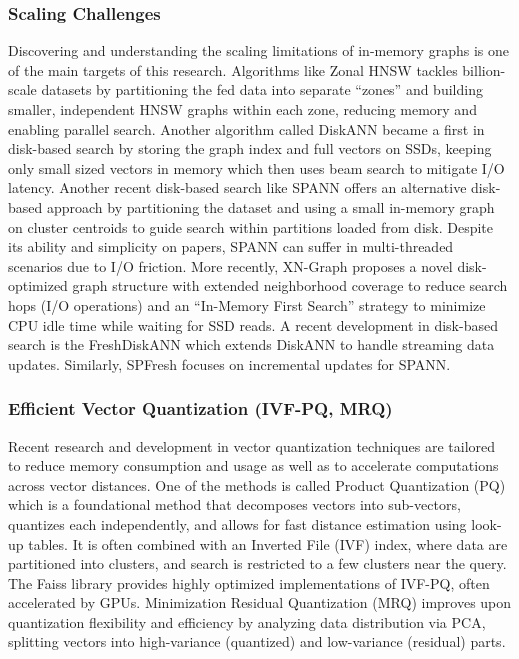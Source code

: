 \documentclass[conference]{IEEEtran}
\begin{document}
\subsubsection{Scaling Challenges}
Discovering and understanding the scaling limitations of in-memory graphs is one of the main targets of this research. Algorithms like Zonal HNSW tackles billion-scale datasets by partitioning the fed data into separate ``zones'' and building smaller, independent HNSW graphs within each zone, reducing memory and enabling parallel search. Another algorithm called DiskANN became a first in disk-based search by storing the graph index and full vectors on SSDs, keeping only small sized vectors in memory which then uses beam search to mitigate I/O latency. Another recent disk-based search like SPANN offers an alternative disk-based approach by partitioning the dataset and using a small in-memory graph on cluster centroids to guide search within partitions loaded from disk. Despite its ability and simplicity on papers, SPANN can suffer in multi-threaded scenarios due to I/O friction. More recently, XN-Graph proposes a novel disk-optimized graph structure with extended neighborhood coverage to reduce search hops (I/O operations) and an ``In-Memory First Search'' strategy to minimize CPU idle time while waiting for SSD reads. A recent development in disk-based search is the FreshDiskANN which extends DiskANN to handle streaming data updates. Similarly, SPFresh focuses on incremental updates for SPANN.

\subsubsection{Efficient Vector Quantization (IVF-PQ, MRQ)}
Recent research and development in vector quantization techniques are tailored to reduce memory consumption and usage as well as to accelerate computations across vector distances. One of the methods is called Product Quantization (PQ) which is a foundational method that decomposes vectors into sub-vectors, quantizes each independently, and allows for fast distance estimation using look-up tables. It is often combined with an Inverted File (IVF) index, where data are partitioned into clusters, and search is restricted to a few clusters near the query. The Faiss library provides highly optimized implementations of IVF-PQ, often accelerated by GPUs. Minimization Residual Quantization (MRQ) improves upon quantization flexibility and efficiency by analyzing data distribution via PCA, splitting vectors into high-variance (quantized) and low-variance (residual) parts.
\end{document}
